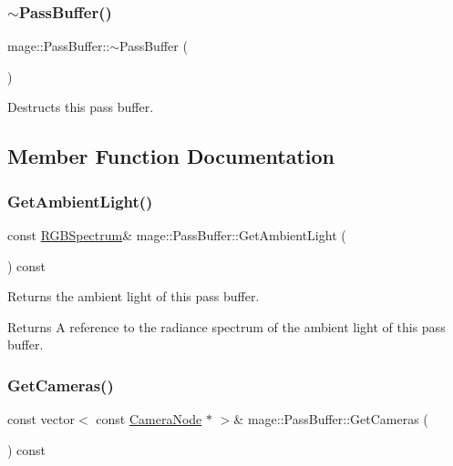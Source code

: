\subsubsection{\texorpdfstring{$\sim$\+Pass\+Buffer()}{~PassBuffer()}}
{\footnotesize\ttfamily mage\+::\+Pass\+Buffer\+::$\sim$\+Pass\+Buffer (\begin{DoxyParamCaption}{ }\end{DoxyParamCaption})\hspace{0.3cm}{\ttfamily [default]}}

Destructs this pass buffer. 

\subsection{Member Function Documentation}
\hypertarget{structmage_1_1_pass_buffer_a91cbe609833b84c12113c9676b9de903}{}\label{structmage_1_1_pass_buffer_a91cbe609833b84c12113c9676b9de903} 
\subsubsection{\texorpdfstring{Get\+Ambient\+Light()}{GetAmbientLight()}}
{\footnotesize\ttfamily const \hyperlink{structmage_1_1_r_g_b_spectrum}{R\+G\+B\+Spectrum}\& mage\+::\+Pass\+Buffer\+::\+Get\+Ambient\+Light (\begin{DoxyParamCaption}{ }\end{DoxyParamCaption}) const\hspace{0.3cm}{\ttfamily [noexcept]}}

Returns the ambient light of this pass buffer.

\begin{DoxyReturn}{Returns}
A reference to the radiance spectrum of the ambient light of this pass buffer. 
\end{DoxyReturn}
\hypertarget{structmage_1_1_pass_buffer_a1b3745dab0028b470c76c695e55f6466}{}\label{structmage_1_1_pass_buffer_a1b3745dab0028b470c76c695e55f6466} 
\subsubsection{\texorpdfstring{Get\+Cameras()}{GetCameras()}}
{\footnotesize\ttfamily const vector$<$ const \hyperlink{classmage_1_1_camera_node}{Camera\+Node} $\ast$ $>$\& mage\+::\+Pass\+Buffer\+::\+Get\+Cameras (\begin{DoxyParamCaption}{ }\end{DoxyParamCaption}) const\hspace{0.3cm}{\ttfamily [noexcept]}}

